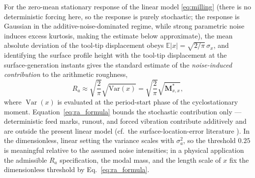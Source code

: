 \documentclass[preprint,12pt]{elsarticle}
\begin{document}
\begin{table}[ht!]
\centering
\small
\caption{Computational cost of the layers of Fig.~\ref{fig:ssv}. Each job ran alone on $56$ threads of the workstation specified in Section~\ref{sec:results}; boundary curves use the two-phase MDBM pattern (zeroth-order bracketing + one linear-interpolation pass). ``Equivalent resolution'' is the uniform grid that a brute-force sweep would need for the same boundary accuracy.}
\label{tab:ssv_cost}
\end{table} For the zero-mean stationary response of the linear model \eqref{eq:milling} (there is no deterministic forcing here, so the response is purely stochastic; the response is Gaussian in the additive-noise-dominated regime, while strong parametric noise induces excess kurtosis, making the estimate below approximate), the mean absolute deviation of the tool-tip displacement obeys $\mathbb{E}|x| = \sqrt{2/\pi}\,\sigma_x$, and identifying the surface profile height with the tool-tip displacement at the surface-generation instants gives the standard estimate of the \emph{noise-induced contribution} to the arithmetic roughness,
\begin{equation}
\label{eq:ra_formula}
R_a \approx \sqrt{\frac{2}{\pi}} \sqrt{\text{Var}(x)} = \sqrt{\frac{2}{\pi}} \sqrt{\mathbf{M}^*_{x,x}},
\end{equation}
where $\operatorname{Var}(x)$ is evaluated at the period-start phase of the cyclostationary moment. Equation~\eqref{eq:ra_formula} bounds the stochastic contribution only --- deterministic feed marks, runout, and forced vibration contribute additively and are outside the present linear model (cf.\ the surface-location-error literature \cite{HoneycuttSchmitz2017}). In the dimensionless, linear setting the variance scales with $\sigma_a^2$, so the threshold $0.25$ is meaningful relative to the assumed noise intensities; in a physical application the admissible $R_a$ specification, the modal mass, and the length scale of $x$ fix the dimensionless threshold by Eq.~\eqref{eq:ra_formula}.
\end{document}
